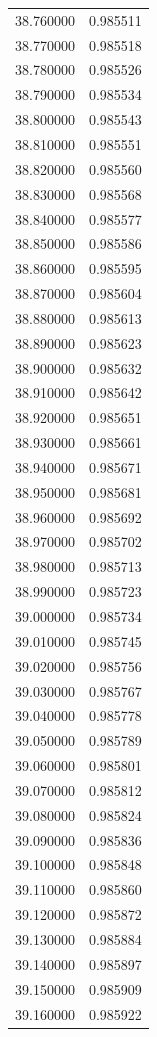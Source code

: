 \begin{tabular}{rr}
38.760000 & 0.985511 \\
38.770000 & 0.985518 \\
38.780000 & 0.985526 \\
38.790000 & 0.985534 \\
38.800000 & 0.985543 \\
38.810000 & 0.985551 \\
38.820000 & 0.985560 \\
38.830000 & 0.985568 \\
38.840000 & 0.985577 \\
38.850000 & 0.985586 \\
38.860000 & 0.985595 \\
38.870000 & 0.985604 \\
38.880000 & 0.985613 \\
38.890000 & 0.985623 \\
38.900000 & 0.985632 \\
38.910000 & 0.985642 \\
38.920000 & 0.985651 \\
38.930000 & 0.985661 \\
38.940000 & 0.985671 \\
38.950000 & 0.985681 \\
38.960000 & 0.985692 \\
38.970000 & 0.985702 \\
38.980000 & 0.985713 \\
38.990000 & 0.985723 \\
39.000000 & 0.985734 \\
39.010000 & 0.985745 \\
39.020000 & 0.985756 \\
39.030000 & 0.985767 \\
39.040000 & 0.985778 \\
39.050000 & 0.985789 \\
39.060000 & 0.985801 \\
39.070000 & 0.985812 \\
39.080000 & 0.985824 \\
39.090000 & 0.985836 \\
39.100000 & 0.985848 \\
39.110000 & 0.985860 \\
39.120000 & 0.985872 \\
39.130000 & 0.985884 \\
39.140000 & 0.985897 \\
39.150000 & 0.985909 \\
39.160000 & 0.985922 \\

\end{tabular}
